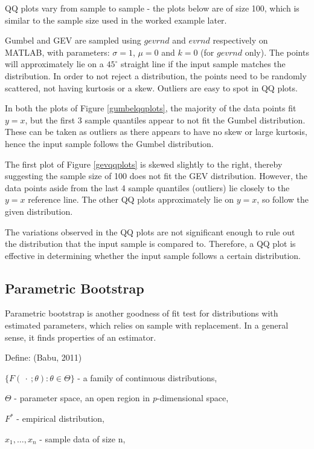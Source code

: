 \documentclass{article}
\begin{document}
QQ plots vary from sample to sample - the plots below are of size 100, which is similar to the sample size used in the worked example later.

Gumbel and GEV are sampled using $gevrnd$ and $evrnd$ respectively on MATLAB, with parameters: $\sigma = 1$, $\mu = 0$ and $k = 0$ (for $gevrnd$ only). The points will approximately lie on a $45^{\circ}$ straight line if the input sample matches the distribution. In order to not reject a distribution, the points need to be randomly scattered, not having kurtosis or a skew. Outliers are easy to spot in QQ plots.

In both the plots of Figure \ref{gumbelqqplots}, the majority of the data points fit $y = x$, but the first 3 sample quantiles appear to not fit the Gumbel distribution. These can be taken as outliers as there appears to have no skew or large kurtosis, hence the input sample follows the Gumbel distribution.

The first plot of Figure \ref{gevqqplots} is skewed slightly to the right, thereby suggesting the sample size of 100 does not fit the GEV distribution. However, the data points aside from the last 4 sample quantiles (outliers) lie closely to the $y = x$ reference line. The other QQ plots approximately lie on $y=x$, so follow the given distribution.

The variations observed in the QQ plots are not significant enough to rule out the distribution that the input sample is compared to. Therefore, a QQ plot is effective in determining whether the input sample follows a certain distribution. 

\subsection{Parametric Bootstrap} 

Parametric bootstrap is another goodness of fit test for distributions with estimated parameters, which relies on sample with replacement. In a general sense, it finds properties of an estimator.

Define: (Babu, 2011)

$\{F(\ \cdot \ ; \theta): \theta \in \Theta\}$ - a family of continuous distributions,

$\Theta$ - parameter space, an open region in \textit{p}-dimensional space,

$F^{*}$ - empirical distribution,

$x_1,\ldots,x_n$ - sample data of size n,  
\end{document}
